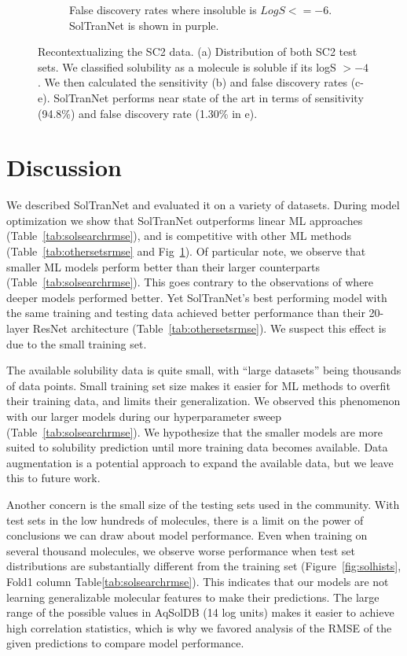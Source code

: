 \documentclass[journal=jmcmar,manuscript=article]{achemso}
\begin{document}
\begin{figure}[tb]
\begin{subfigure}[t]{0.32\textwidth}
        \caption{False discovery rates where insoluble is $LogS <=-6$. SolTranNet is shown in purple.}
    \end{subfigure}
    \caption{Recontextualizing the SC2 data. (a) Distribution of both SC2 test sets. We classified solubility as a molecule is soluble if its logS $> -4$. We then calculated the sensitivity (b) and false discovery rates (c-e). SolTranNet performs near state of the art in terms of sensitivity (94.8\%) and false discovery rate (1.30\% in e).}
    \label{fig:sc2redo}
\end{figure}

\section{Discussion}

We described SolTranNet and evaluated it on a variety of datasets.
During model optimization we show that SolTranNet outperforms linear ML approaches (Table~\ref{tab:solsearchrmse}), and is competitive with other ML methods (Table~\ref{tab:othersetsrmse} and Fig~\ref{fig:sc2redo}).
Of particular note, we observe that smaller ML models perform better than their larger counterparts (Table~\ref{tab:solsearchrmse}).
This goes contrary to the observations of \citet{cui} where deeper models performed better.
Yet SolTranNet's best performing model with the same training and testing data achieved better performance than their 20-layer ResNet architecture \cite{cui} (Table~\ref{tab:othersetsrmse}).
We suspect this effect is due to the small training set.

The available solubility data is quite small, with ``large datasets'' being thousands of data points.
Small training set size makes it easier for ML methods to overfit their training data, and limits their generalization.
We observed this phenomenon with our larger models during our hyperparameter sweep (Table~\ref{tab:solsearchrmse}).
We hypothesize that the smaller models are more suited to solubility prediction until more training data becomes available.
Data augmentation is a potential approach to expand the available data, but we leave this to future work.

Another concern is the small size of the testing sets used in the community.
With test sets in the low hundreds of molecules, there is a limit on the power of conclusions we can draw about model performance.
Even when training on several thousand molecules, we observe worse performance when test set distributions are substantially different from the training set (Figure~\ref{fig:solhists}, Fold1 column Table\ref{tab:solsearchrmse}).
This indicates that our models are not learning generalizable molecular features to make their predictions.
The large range of the possible values in AqSolDB (14 log units) makes it easier to achieve high correlation statistics, which is why we favored analysis of the RMSE of the given predictions to compare model performance.
\end{document}
